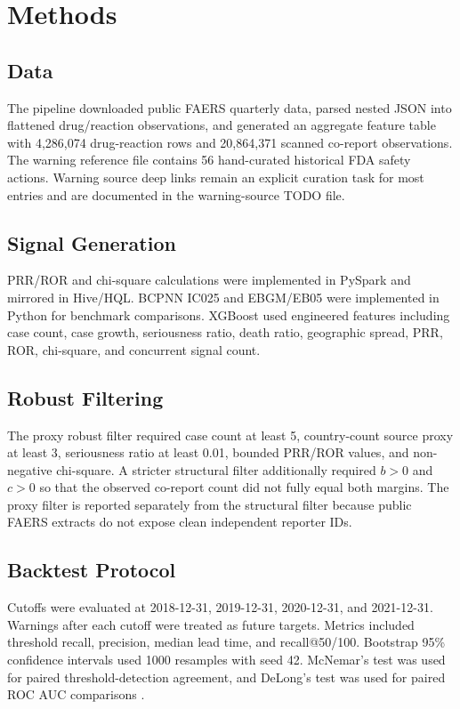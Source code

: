 \documentclass[12pt,onecolumn]{IEEEtran}
\begin{document}
\section{Methods}
\subsection{Data}
The pipeline downloaded public FAERS quarterly data, parsed nested JSON into
flattened drug/reaction observations, and generated an aggregate feature table
with 4,286,074 drug-reaction rows and 20,864,371 scanned co-report
observations. The warning reference file contains 56 hand-curated historical FDA
safety actions. Warning source deep links remain an explicit curation task for
most entries and are documented in the warning-source TODO file.

\subsection{Signal Generation}
PRR/ROR and chi-square calculations were implemented in PySpark and mirrored in
Hive/HQL. BCPNN IC025 and EBGM/EB05 were implemented in Python for benchmark
comparisons. XGBoost used engineered features including case count, case growth,
seriousness ratio, death ratio, geographic spread, PRR, ROR, chi-square, and
concurrent signal count.

\subsection{Robust Filtering}
The proxy robust filter required case count at least 5, country-count source
proxy at least 3, seriousness ratio at least 0.01, bounded PRR/ROR values, and
non-negative chi-square. A stricter structural filter additionally required
$b>0$ and $c>0$ so that the observed co-report count did not fully equal both
margins. The proxy filter is reported separately from the structural filter
because public FAERS extracts do not expose clean independent reporter IDs.

\subsection{Backtest Protocol}
Cutoffs were evaluated at 2018-12-31, 2019-12-31, 2020-12-31, and 2021-12-31.
Warnings after each cutoff were treated as future targets. Metrics included
threshold recall, precision, median lead time, and recall@50/100. Bootstrap
95\% confidence intervals used 1000 resamples with seed 42. McNemar's test was
used for paired threshold-detection agreement, and DeLong's test was used for
paired ROC AUC comparisons \cite{delong1988roc,sun2014delong,efron1993bootstrap}.
\end{document}
